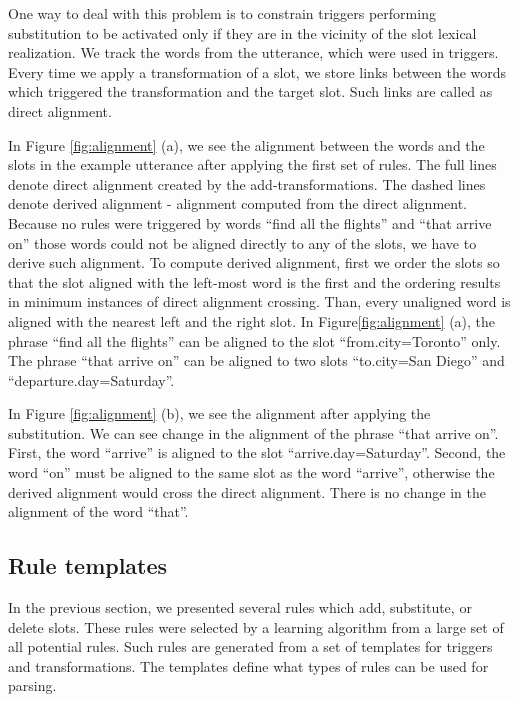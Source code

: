 \documentclass{article}
\begin{document}

One way to deal with this problem is to constrain triggers performing substitution to be activated only if they are in the vicinity of the slot lexical realization. We track the words from the utterance, which were used in triggers. Every time we apply a transformation of a slot, we store links between the words which triggered the transformation and the target slot. Such links are called as direct alignment. 


In Figure \ref{fig:alignment} (a), we see the alignment between the words and the slots in the example utterance after applying the first set of rules. The full lines denote direct alignment created by the add-transformations. The dashed lines denote derived alignment - alignment computed from the direct alignment. Because no rules were triggered by words ``find all the flights'' and ``that arrive on'' those words could not be aligned directly to any of the slots, we have to derive such alignment. To compute derived alignment, first we order the slots so that the slot aligned with the left-most word is the first and the ordering results in minimum instances of direct alignment crossing. Than, every unaligned word is aligned with the nearest left and the right slot. In Figure\ref{fig:alignment} (a), the phrase ``find all the flights'' can be aligned to the slot ``from.city=Toronto'' only. The phrase ``that arrive on'' can be aligned to two slots ``to.city=San Diego'' and ``departure.day=Saturday''.

In Figure \ref{fig:alignment} (b), we see the alignment after applying the substitution. We can see change in the alignment of the phrase ``that arrive on''. First, the word ``arrive'' is aligned to the slot ``arrive.day=Saturday''. Second, the word ``on'' must be aligned to the same slot as the word ``arrive'',  otherwise the derived alignment would cross the direct alignment. There is no change in the alignment of the word ``that''.

\subsection{Rule templates}
In the previous section, we presented several rules which add, substitute, or delete slots. These rules were selected by a learning algorithm from a large set of all potential rules. Such rules are generated from a set of templates for triggers and transformations. The templates define what types of rules can be used for parsing. 
\end{document}
